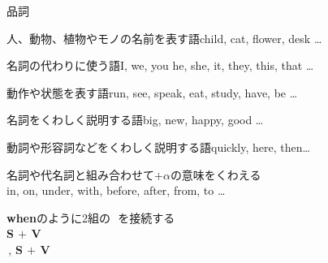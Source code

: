 \documentclass[aspectratio=169,xcolor={dvipsnames,table}]{beamer}
\begin{document}
\begin{frame}[plain,label=basic]{品詞}
 
\begin{description}
 \item[名詞] 人、動物、植物やモノの名前を表す語\hfill{\small child, cat, flower, desk \ldots}
  \item[代名詞] 名詞の代わりに使う語\hfill{\small I, we, you he, she, it, they, this, that \ldots}
 \item[動詞] 動作や状態を表す語\hfill{\small run, see, speak, eat, study, have, be \ldots{}}
 \item[形容詞] 名詞をくわしく説明する語\hfill{\small big, new, happy, good \ldots}
 \item[副詞] 動詞や形容詞などをくわしく説明する語\hfill{\small quickly, here, then\ldots}
 \item[前置詞] 名詞や代名詞と組み合わせて$+\alpha$の意味をくわえる\\
\hfill{\small in, on, under, with, before, after, from, to \ldots}
 \item<2>[接続詞] {\bfseries when}のように2組の\,\,\,\,を接続する\\
\hfill{}{\bfseries S $+$ V}\,\,\,\\
\hfill{}\,,\,\,{\bfseries S $+$ V}
\end{description}

\end{frame}
\end{document}
